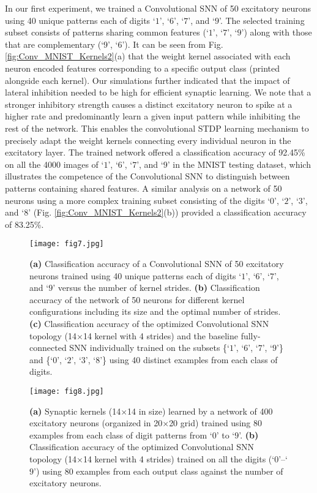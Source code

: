 \documentclass[journal, onecolumn]{IEEEtran}
\begin{document}
In our first experiment, we trained a Convolutional SNN of 50 excitatory neurons using 40 unique patterns each of digits `$1$', `$6$', `$7$', and `$9$'. The selected training subset consists of patterns sharing common features (`$1$', `$7$', `$9$') along with those that are complementary (`$9$', `$6$'). It can be seen from Fig. \ref{fig:Conv_MNIST_Kernels2}(a) that the weight kernel associated with each neuron encoded features corresponding to a specific output class (printed alongside each kernel). Our simulations further indicated that the impact of lateral inhibition needed to be high for efficient synaptic learning. We note that a stronger inhibitory strength causes a distinct excitatory neuron to spike at a higher rate and predominantly learn a given input pattern while inhibiting the rest of the network. This enables the convolutional STDP learning mechanism to precisely adapt the weight kernels connecting every individual neuron in the excitatory layer. The trained network offered a classification accuracy of 92.45\% on all the 4000 images of `$1$', `$6$', `$7$', and `$9$' in the MNIST testing dataset, which illustrates the competence of the Convolutional SNN to distinguish between patterns containing shared features. A similar analysis on a network of 50 neurons using a more complex training subset consisting of the digits `$0$', `$2$', `$3$', and `$8$' (Fig. \ref{fig:Conv_MNIST_Kernels2}(b)) provided a classification accuracy of 83.25\%.

\begin{figure}[!t]
\centering
\texttt{[image: fig7.jpg]}
\caption{\textbf{(a)} Classification accuracy of a Convolutional SNN of 50 excitatory neurons trained using 40 unique patterns each of digits `$1$', `$6$', `$7$', and `$9$' versus the number of kernel strides. \textbf{(b)} Classification accuracy of the network of 50 neurons for different kernel configurations including its size and the optimal number of strides. \textbf{(c)} Classification accuracy of the optimized Convolutional SNN topology (14$\times$14 kernel with 4 strides) and the baseline fully-connected SNN individually trained on the subsets \{`$1$', `$6$', `$7$', `$9$'\} and \{`$0$', `$2$', `$3$', `$8$'\} using 40 distinct examples from each class of digits.}
\label{fig:Conv_MNIST_Results1}
\end{figure}

\begin{figure}[!t]
\centering
\texttt{[image: fig8.jpg]}
\caption{\textbf{(a)} Synaptic kernels (14$\times$14 in size) learned by a network of 400 excitatory neurons (organized in 20$\times$20 grid) trained using 80 examples from each class of digit patterns from `$0$' to `$9$'. \textbf{(b)} Classification accuracy of the optimized Convolutional SNN topology (14$\times$14 kernel with 4 strides) trained on all the digits (`$0$'--`$9$') using 80 examples from each output class against the number of excitatory neurons.}
\label{fig:Conv_MNIST_Results2}
\end{figure}
\end{document}
